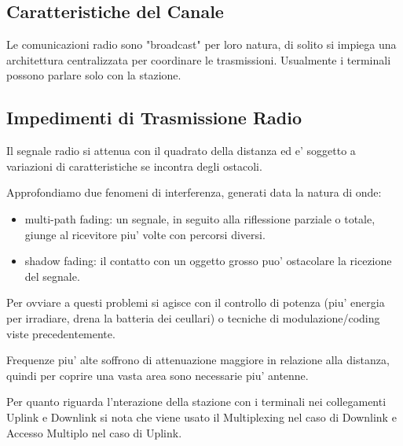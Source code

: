 \subsection{Caratteristiche del Canale}

Le comunicazioni radio sono "broadcast" per loro natura, di solito si impiega una architettura centralizzata per coordinare le trasmissioni. Usualmente i terminali possono parlare solo con la stazione.


\subsection{Impedimenti di Trasmissione Radio}

Il segnale radio si attenua con il quadrato della distanza ed e' soggetto a variazioni di caratteristiche se incontra degli ostacoli.


Approfondiamo due fenomeni di interferenza, generati data la natura di onde:

\begin{itemize}
  \item multi-path fading: un segnale, in seguito alla riflessione parziale o totale, giunge al ricevitore piu' volte con percorsi diversi.
  \item shadow fading: il contatto con un oggetto grosso puo' ostacolare la ricezione del segnale.
\end{itemize}


Per ovviare a questi problemi si agisce con il controllo di potenza (piu' energia per irradiare, drena la batteria dei ceullari) o tecniche di modulazione/coding viste precedentemente.

Frequenze piu' alte soffrono di attenuazione maggiore in relazione alla distanza, quindi per coprire una vasta area sono necessarie piu' antenne.


Per quanto riguarda l'nterazione della stazione con i terminali nei collegamenti Uplink e Downlink si nota che viene usato il Multiplexing nel caso di Downlink e Accesso Multiplo nel caso di Uplink.


